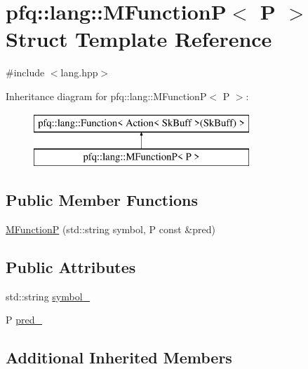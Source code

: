 \hypertarget{structpfq_1_1lang_1_1MFunctionP}{\section{pfq\+:\+:lang\+:\+:M\+Function\+P$<$ P $>$ Struct Template Reference}
\label{structpfq_1_1lang_1_1MFunctionP}
}


{\ttfamily \#include $<$lang.\+hpp$>$}

Inheritance diagram for pfq\+:\+:lang\+:\+:M\+Function\+P$<$ P $>$\+:\begin{figure}[H]
\begin{center}
\leavevmode
\includegraphics[height=2.000000cm]{structpfq_1_1lang_1_1MFunctionP}
\end{center}
\end{figure}
\subsection*{Public Member Functions}
\begin{DoxyCompactItemize}
\item 
\hyperlink{structpfq_1_1lang_1_1MFunctionP_a306e1d8f486f24c5c5a12a7b1697398f}{M\+Function\+P} (std\+::string symbol, P const \&pred)
\end{DoxyCompactItemize}
\subsection*{Public Attributes}
\begin{DoxyCompactItemize}
\item 
std\+::string \hyperlink{structpfq_1_1lang_1_1MFunctionP_a569b3cbf86e3ed960d8f6c253a9475fe}{symbol\+\_\+}
\item 
P \hyperlink{structpfq_1_1lang_1_1MFunctionP_a55d116025817ef4d4c7ac1ba6fd23e3e}{pred\+\_\+}
\end{DoxyCompactItemize}
\subsection*{Additional Inherited Members}


